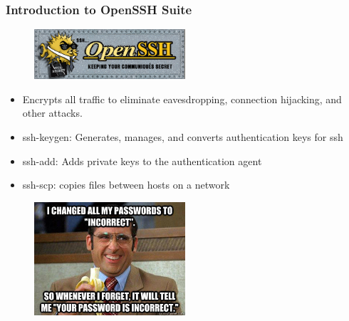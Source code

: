\documentclass{beamer}
\begin{document}
\begin{frame}
	\frametitle{\textbf{Introduction to OpenSSH Suite}}

	\begin{multicols}{2}
		\begin{figure}[h]
			\begin{flushleft}
			\includegraphics[width=0.5\textwidth]{img/openssh.png}
			\end{flushleft}
		\end{figure}
		
		\begin{itemize}
			\item Encrypts all traffic to eliminate eavesdropping, connection hijacking, and other attacks.

			\vspace{0.2cm}
			\item ssh-keygen: Generates, manages, and converts authentication keys for ssh
			\item ssh-add: Adds private keys to the authentication agent
			\item ssh-scp: copies files between hosts on a network 
		\end{itemize}

		\begin{figure}[h]
			\begin{flushright}
			\includegraphics[width=0.5\textwidth]{img/securityMeme.jpeg}
			\end{flushright}
		\end{figure}
	\end{multicols}
\end{frame}
\end{document}
